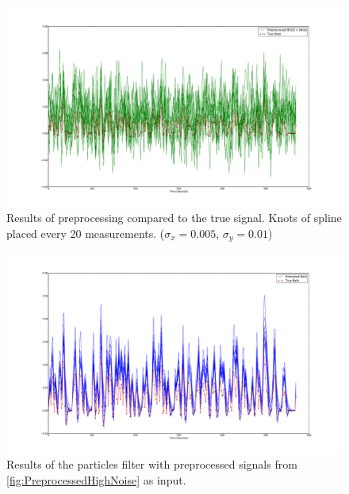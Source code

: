 \begin{figure}
\includegraphics[clip=true,trim=6cm 2cm 5cm 3.5cm,width=15cm]{images/preprocessed_highnoise}
\caption[Preprocessed Signal with High Noise/Drift]
{Results of preprocessing compared to the true signal.  
 Knots of spline placed every 20 measurements. ($\sigma_x = 0.005$, $\sigma_y = 0.01$)}
\label{fig:PreprocessedHighNoise}
\end{figure}

\begin{figure}
\includegraphics[clip=true,trim=6cm 2cm 5cm 3.5cm,width=15cm]{images/comparison_highnoise}
\caption[Results with High Noise/Drift]
{Results of the particles filter with preprocessed signals from \autoref{fig:PreprocessedHighNoise}
as input.}
\label{fig:FitComparisonHighNoise}
\end{figure}

